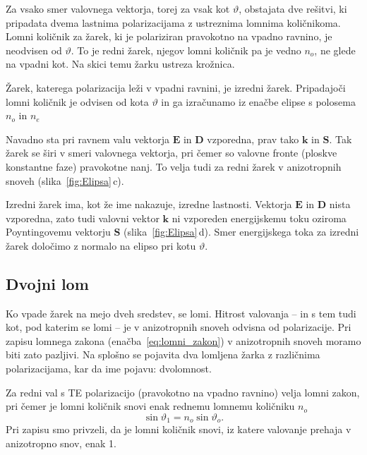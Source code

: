 Za vsako smer valovnega vektorja, torej za vsak kot $\vartheta$, obstajata dve rešitvi, 
ki pripadata dvema lastnima polarizacijama z ustreznima lomnima količnikoma. 
Lomni količnik za žarek, ki je polariziran pravokotno na vpadno ravnino, 
je neodvisen od $\vartheta$. To je redni žarek, njegov lomni količnik 
pa je vedno $n_o$, ne glede na vpadni kot. Na skici temu žarku ustreza krožnica.

Žarek, katerega polarizacija leži v vpadni ravnini, je izredni žarek. Pripadajoči
lomni količnik je odvisen od kota $\vartheta$ in 
ga izračunamo iz enačbe elipse s polosema $n_o$ in $n_e$ 

Navadno sta pri ravnem valu vektorja $\mathbf{E}$ in $\mathbf{D}$ vzporedna, 
prav tako $\mathbf{k}$ in $\mathbf{S}$. Tak žarek se širi v smeri valovnega vektorja, pri čemer
so valovne fronte (ploskve konstantne faze) pravokotne nanj. To velja tudi za redni žarek v anizotropnih
snoveh (slika~\ref{fig:Elipsa}\,c). 

Izredni žarek ima, kot že ime nakazuje, izredne lastnosti. Vektorja
$\mathbf{E}$ in $\mathbf{D}$ nista vzporedna, zato tudi valovni vektor $\mathbf{k}$ ni vzporeden
energijskemu toku oziroma Poyntingovemu vektorju $\mathbf{S}$ (slika~\ref{fig:Elipsa}\,d). 
Smer energijskega toka za izredni žarek določimo z normalo 
na elipso pri kotu $\vartheta$. 

\subsection*{Dvojni lom}
Ko vpade žarek na mejo dveh sredstev, se lomi. Hitrost valovanja -- in s tem tudi 
kot, pod katerim se lomi -- je v anizotropnih snoveh odvisna od polarizacije.
Pri zapisu lomnega zakona (enačba~\ref{eq:lomni_zakon}) 
v anizotropnih snoveh moramo biti zato pazljivi. Na splošno
se pojavita dva lomljena žarka z različnima polarizacijama, kar
da ime pojavu: dvolomnost. 

Za redni val s TE polarizacijo (pravokotno na vpadno ravnino) velja lomni zakon, pri čemer
je lomni količnik snovi enak rednemu lomnemu količniku $n_o$
\begin{equation}
\sin\vartheta_{1}=n_{o}\sin\vartheta_{o}.
\end{equation}
Pri zapisu smo privzeli, da je lomni količnik snovi, iz katere valovanje prehaja v anizotropno snov, 
enak 1. 

